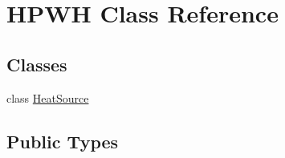 \hypertarget{class_h_p_w_h}{\section{H\-P\-W\-H Class Reference}
\label{class_h_p_w_h}
}
\subsection*{Classes}
\begin{DoxyCompactItemize}
\item 
class \hyperlink{class_h_p_w_h_1_1_heat_source}{Heat\-Source}
\end{DoxyCompactItemize}
\subsection*{Public Types}
